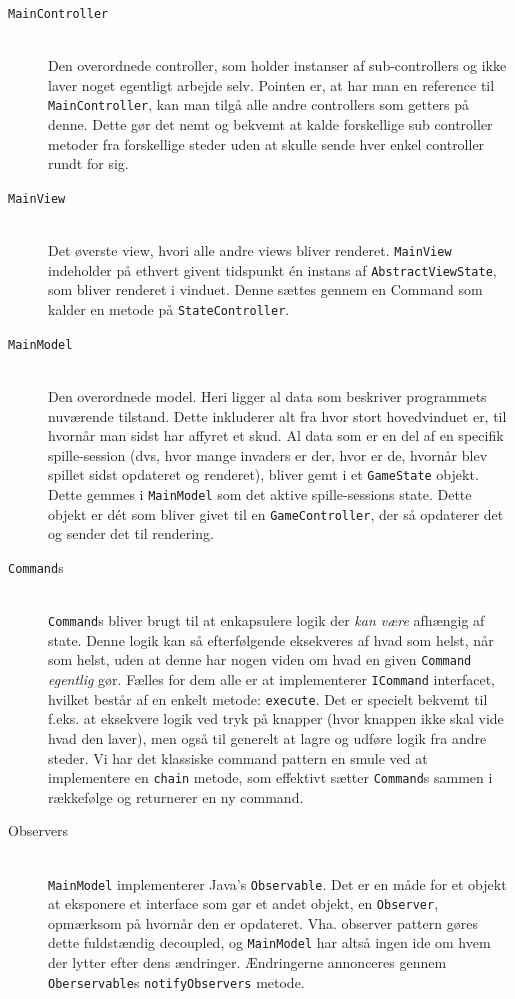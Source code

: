 \documentclass[titlepage,danish]{article}
\newcommand{\code}[1]{\texttt{#1}}
\begin{document}
\begin{description}
\item[\code{MainController}] \hfill \\
  Den overordnede controller, som holder instanser af sub-controllers og ikke laver noget egentligt
  arbejde selv. Pointen er, at har man en reference til \code{MainController}, kan man tilgå alle
  andre controllers som getters på denne. Dette gør det nemt og bekvemt at kalde forskellige sub
  controller metoder fra forskellige steder uden at skulle sende hver enkel controller rundt for
  sig.

\item[\code{MainView}]  \hfill \\
  Det øverste view, hvori alle andre views bliver renderet. \code{MainView} indeholder på ethvert
  givent tidspunkt én instans af \code{AbstractViewState}, som bliver renderet i vinduet. Denne
  sættes gennem en Command som kalder en metode på \code{StateController}.

\item[\code{MainModel}]  \hfill \\
  Den overordnede model. Heri ligger al data som beskriver programmets nuværende tilstand. Dette
  inkluderer alt fra hvor stort hovedvinduet er, til hvornår man sidst har affyret et skud. Al data
  som er en del af en specifik spille-session (dvs, hvor mange invaders er der, hvor er de, hvornår
  blev spillet sidst opdateret og renderet), bliver gemt i et \code{GameState} objekt. Dette gemmes
  i \code{MainModel} som det aktive spille-sessions state. Dette objekt er dét som bliver givet til
  en \code{GameController}, der så opdaterer det og sender det til rendering.

\item[\code{Command}s] \hfill \\
  \code{Command}s bliver brugt til at enkapsulere logik der \emph{kan være} afhængig af state. Denne
  logik kan så efterfølgende eksekveres af hvad som helst, når som helst, uden at denne har nogen
  viden om hvad en given \code{Command} \emph{egentlig} gør. Fælles for dem alle er at implementerer
  \code{ICommand} interfacet, hvilket består af en enkelt metode: \code{execute}.  Det er specielt
  bekvemt til f.eks. at eksekvere logik ved tryk på knapper (hvor knappen ikke skal vide hvad den
  laver), men også til generelt at lagre og udføre logik fra andre steder.  Vi har det klassiske
  command pattern en smule ved at implementere en \code{chain} metode, som effektivt sætter
  \code{Command}s sammen i rækkefølge og returnerer en ny command.

\item[Observers] \hfill \\
  \code{MainModel} implementerer Java's \code{Observable}. Det er en måde for et objekt at eksponere
  et interface som gør et andet objekt, en \code{Observer}, opmærksom på hvornår den er
  opdateret. Vha. observer pattern gøres dette fuldstændig decoupled, og \code{MainModel} har altså
  ingen ide om hvem der lytter efter dens ændringer. Ændringerne annonceres gennem
  \code{Oberservable}s \code{notifyObservers} metode.
\end{description}
\end{document}
